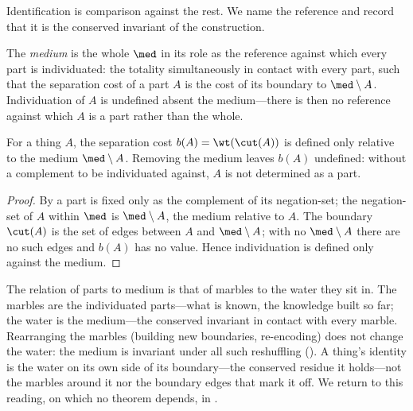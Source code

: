 Identification is comparison against the rest. We name the reference and record
that it is the conserved invariant of the construction.

\begin{definition}[Medium]
\label{def:medium}
The \emph{medium} is the whole $\med$ in its role as the reference against which
every part is individuated: the totality simultaneously in contact with every
part, such that the separation cost of a part $A$ is the cost of its boundary to
$\med\setminus A$. Individuation of $A$ is undefined absent the medium---there is
then no reference against which $A$ is a part rather than the whole.
\end{definition}

\begin{proposition}
\label{prop:medium-required}
For a thing $A$, the separation cost $b(A)=\wt(\cut(A))$ is defined only relative
to the medium $\med\setminus A$. Removing the medium leaves $b(A)$ undefined:
without a complement to be individuated against, $A$ is not determined as a part.
\end{proposition}

\begin{proof}
By  a part is fixed only as the complement of its
negation-set; the negation-set of $A$ within $\med$ is $\med\setminus A$, the
medium relative to $A$. The boundary $\cut(A)$ is the set of edges between $A$ and
$\med\setminus A$; with no $\med\setminus A$ there are no such edges and $b(A)$
has no value. Hence individuation is defined only against the medium.
\end{proof}

\begin{remark}
\label{rem:marbles}
The relation of parts to medium is that of marbles to the water they sit in. The
marbles are the individuated parts---what is known, the knowledge built so far;
the water is the medium---the conserved invariant in contact with every marble.
Rearranging the marbles \textup{(}building new boundaries, re-encoding\textup{)}
does not change the water: the medium is invariant under all such reshuffling
\textup{(}\textup{)}. A thing's identity is the
water on its own side of its boundary---the conserved residue it holds---not the
marbles around it nor the boundary edges that mark it off. We return to this
reading, on which no theorem depends, in .
\end{remark}

